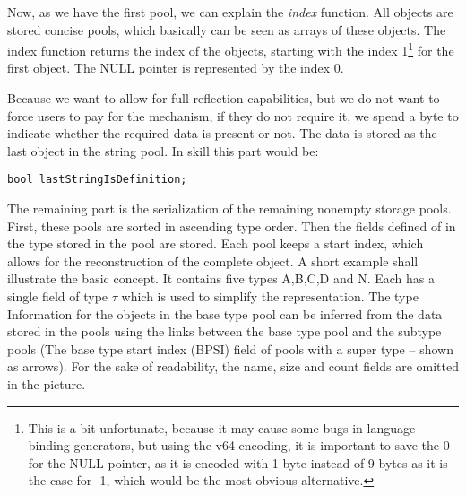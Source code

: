 \documentclass[a4paper,10pt]{article}
\begin{document}
Now, as we have the first pool, we can explain the \textit{index} function. All objects are stored concise pools, which basically can be seen as arrays of these objects. The index function returns the index of the objects, starting with the index 1\footnote{This is a bit unfortunate, because it may cause some bugs in language binding generators, but using the v64 encoding, it is important to save the 0 for the NULL pointer, as it is encoded with 1 byte instead of 9 bytes as it is the case for -1, which would be the most obvious alternative.} for the first object. The NULL pointer is represented by the index 0.

Because we want to allow for full reflection capabilities, but we do not want to force users to pay for the mechanism, if they do not require it, we spend a byte to indicate whether the required data is present or not. The data is stored as the last object in the string pool. In skill this part would be:
\begin{verbatim}
bool lastStringIsDefinition;
\end{verbatim}

The remaining part is the serialization of the remaining nonempty storage pools. First, these pools are sorted in ascending type order. Then the fields defined of in the type stored in the pool are stored. Each pool keeps a start index, which allows for the reconstruction of the complete object. A short example shall illustrate the basic concept. It contains five types A,B,C,D and N. Each has a single field of type $\tau$ which is used to simplify the representation. The type Information for the objects in the base type pool can be inferred from the data stored in the pools using the links between the base type pool and the subtype pools (The base type start index (BPSI) field of pools with a super type -- shown as arrows). For the sake of readability, the name, size and count fields are omitted in the picture.
\end{document}
